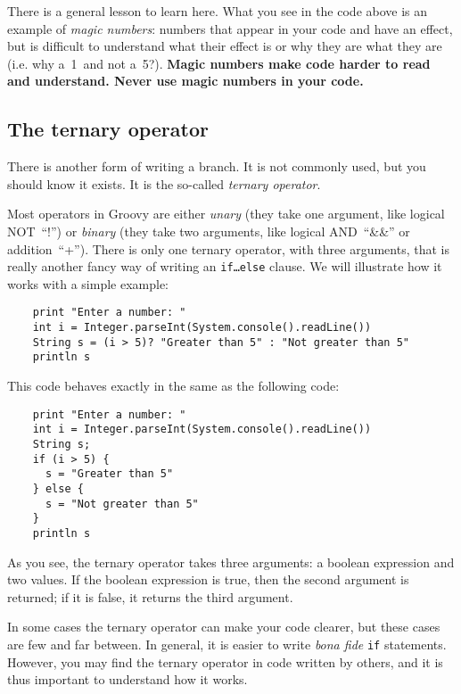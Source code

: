 There is a general lesson to learn here. What you see in the code
above is an example of \emph{magic numbers}: numbers that appear in
your code and have an effect, but is difficult to understand what
their effect is or why they are what they are (i.e. why a~1~and not
a~5?). \textbf{Magic numbers make code harder to read and
  understand. Never use magic numbers in your code.}

\subsection{The ternary operator}
\label{sec:ternary-operator}

There is another form of writing a branch. It is not commonly used,
but you should know it exists. It is the so-called \emph{ternary
  operator}. 

Most operators in Groovy are either \emph{unary} (they take one
argument, like logical NOT~``!'') or \emph{binary} (they take two
arguments, like logical AND~``\&\&'' or addition~``+''). There is only
one ternary operator, with three arguments, that is really another
fancy way of writing an \texttt{if\ldots else} clause. We will
illustrate how it works with a simple example:

\begin{verbatim}
    print "Enter a number: "
    int i = Integer.parseInt(System.console().readLine())
    String s = (i > 5)? "Greater than 5" : "Not greater than 5"
    println s
\end{verbatim}

This code behaves exactly in the same as the following code:

\begin{verbatim}
    print "Enter a number: "
    int i = Integer.parseInt(System.console().readLine())
    String s;
    if (i > 5) {
      s = "Greater than 5"
    } else {
      s = "Not greater than 5"
    }
    println s
\end{verbatim}

As you see, the ternary operator takes three arguments: a boolean
expression and two values. If the boolean expression is true, then the
second argument is returned; if it is false, it returns the third
argument. 

In some cases the ternary operator can make your code clearer, but
these cases are few and far between. In general, it is easier to write
\emph{bona fide} \texttt{if} statements. However, you may find the
ternary operator in code written by others, and it is thus important
to understand how it works. 

